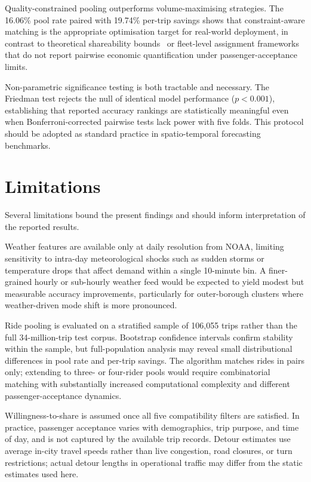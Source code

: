 Quality-constrained pooling outperforms volume-maximising strategies. The 16.06\% pool rate paired with 19.74\% per-trip savings shows that constraint-aware matching is the appropriate optimisation target for real-world deployment, in contrast to theoretical shareability bounds~\parencite{santi2014quantifying} or fleet-level assignment frameworks~\parencite{alonso2017demand} that do not report pairwise economic quantification under passenger-acceptance limits.

Non-parametric significance testing is both tractable and necessary. The Friedman test rejects the null of identical model performance ($p < 0.001$), establishing that reported accuracy rankings are statistically meaningful even when Bonferroni-corrected pairwise tests lack power with five folds. This protocol should be adopted as standard practice in spatio-temporal forecasting benchmarks.

\section{Limitations}

Several limitations bound the present findings and should inform interpretation of the reported results.

Weather features are available only at daily resolution from NOAA, limiting sensitivity to intra-day meteorological shocks such as sudden storms or temperature drops that affect demand within a single 10-minute bin. A finer-grained hourly or sub-hourly weather feed would be expected to yield modest but measurable accuracy improvements, particularly for outer-borough clusters where weather-driven mode shift is more pronounced.

Ride pooling is evaluated on a stratified sample of 106,055 trips rather than the full 34-million-trip test corpus. Bootstrap confidence intervals confirm stability within the sample, but full-population analysis may reveal small distributional differences in pool rate and per-trip savings. The algorithm matches rides in pairs only; extending to three- or four-rider pools would require combinatorial matching with substantially increased computational complexity and different passenger-acceptance dynamics.

Willingness-to-share is assumed once all five compatibility filters are satisfied. In practice, passenger acceptance varies with demographics, trip purpose, and time of day, and is not captured by the available trip records. Detour estimates use average in-city travel speeds rather than live congestion, road closures, or turn restrictions; actual detour lengths in operational traffic may differ from the static estimates used here.

